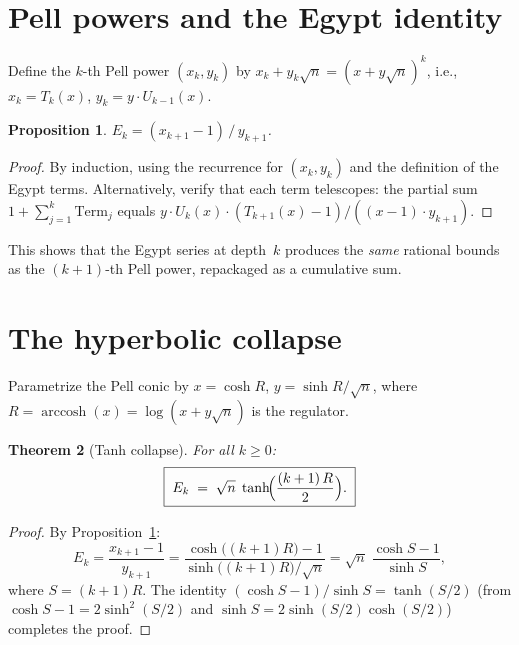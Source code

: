 \documentclass[11pt]{article}
\newtheorem{theorem}{Theorem}
\newtheorem{proposition}[theorem]{Proposition}
\theoremstyle{definition}
\theoremstyle{remark}
\DeclareMathOperator{\arccosh}{arccosh}
\begin{document}
\section{Pell powers and the Egypt identity}

Define the $k$-th Pell power $(x_k, y_k)$ by
$x_k + y_k\sqrt{n} = (x + y\sqrt{n})^k$, i.e.,
$x_k = T_k(x)$, $y_k = y \cdot U_{k-1}(x)$.

\begin{proposition}\label{prop:pellpower}
$E_k = (x_{k+1} - 1)\,/\,y_{k+1}$.
\end{proposition}

\begin{proof}
By induction, using the recurrence for $(x_k, y_k)$ and
the definition of the Egypt terms.
Alternatively, verify that each term telescopes:
the partial sum $1 + \sum_{j=1}^{k} \text{Term}_j$
equals $y \cdot U_k(x) \cdot (T_{k+1}(x) - 1) / ((x-1) \cdot y_{k+1})$.
\end{proof}

This shows that the Egypt series at depth~$k$ produces the
\emph{same} rational bounds as the $(k{+}1)$-th Pell power,
repackaged as a cumulative sum.

\section{The hyperbolic collapse}\label{sec:collapse}

Parametrize the Pell conic by $x = \cosh R$, $y = \sinh R/\sqrt{n}$,
where $R = \arccosh(x) = \log(x + y\sqrt{n})$ is the regulator.

\begin{theorem}[Tanh collapse]\label{thm:tanh}
For all $k \ge 0$:
\begin{equation}\label{eq:tanh}
\boxed{\;E_k \;=\; \sqrt{n}\;\tanh\!\Bigl(\frac{(k+1)\,R}{2}\Bigr).\;}
\end{equation}
\end{theorem}

\begin{proof}
By Proposition~\ref{prop:pellpower}:
\[
E_k = \frac{x_{k+1} - 1}{y_{k+1}}
    = \frac{\cosh\bigl((k{+}1)R\bigr) - 1}
           {\sinh\bigl((k{+}1)R\bigr)/\sqrt{n}}
    = \sqrt{n}\;\frac{\cosh S - 1}{\sinh S},
\]
where $S = (k{+}1)R$.
The identity $(\cosh S - 1)/\sinh S = \tanh(S/2)$
(from $\cosh S - 1 = 2\sinh^2(S/2)$ and
$\sinh S = 2\sinh(S/2)\cosh(S/2)$) completes the proof.
\end{proof}
\end{document}
